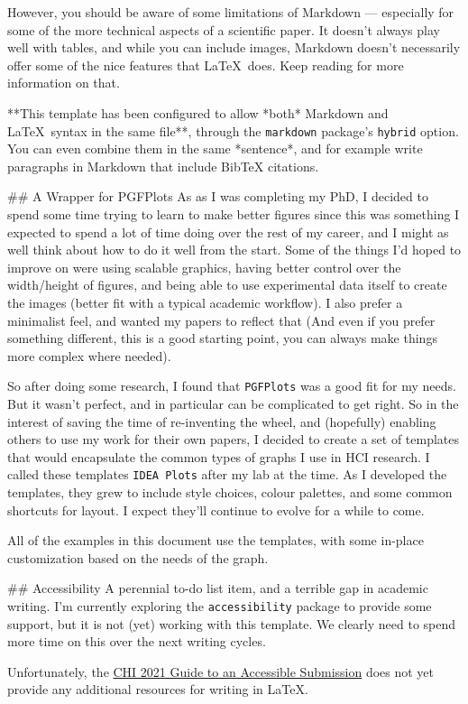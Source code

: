 \begin{markdown}
However, you should be aware of some limitations of Markdown --- especially for some of the more technical aspects of a scientific paper. It doesn't always play well with tables, and while you can include images, Markdown doesn't necessarily offer some of the nice features that \LaTeX\ does. Keep reading for more information on that. 

**This template has been configured to allow *both* Markdown and \LaTeX\ syntax in the same file**, through the \texttt{markdown} package's \texttt{hybrid} option. You can even combine them in the same *sentence*, and for example write paragraphs in Markdown that include BibTeX citations.



## A Wrapper for PGFPlots
As as I was completing my PhD, I decided to spend some time trying to learn to make better figures since this was something I expected to spend a lot of time doing over the rest of my career, and I might as well think about how to do it well from the start. Some of the things I'd hoped to improve on were using scalable graphics, having better control over the width/height of figures, and being able to use experimental data itself to create the images (better fit with a typical academic workflow). I also prefer a minimalist feel, and wanted my papers to reflect that (And even if you prefer something different, this is a good starting point, you can always make things more complex where needed). 

So after doing some research, I found that \texttt{PGFPlots} was a good fit for my needs. But it wasn't perfect, and in particular can be complicated to get right. So in the interest of saving the time of re-inventing the wheel, and (hopefully) enabling others to use my work for their own papers, I decided to create a set of templates that would encapsulate the common types of graphs I use in HCI research. I called these templates \texttt{IDEA Plots} after my lab at the time. As I developed the templates, they grew to include style choices, colour palettes, and some common shortcuts for layout. I expect they'll continue to evolve for a while to come.  

All of the examples in this document use the templates, with some in-place customization based on the needs of the graph. 



## Accessibility
A perennial to-do list item, and a terrible gap in academic writing. I'm currently exploring the \texttt{accessibility} package to provide some support, but it is not (yet) working with this template. We clearly need to spend more time on this over the next writing cycles.

Unfortunately, the \href{https://chi2021.acm.org/for-authors/presenting/papers/guide-to-an-accessible-submission}{CHI 2021 Guide to an Accessible Submission} does not yet provide any additional resources for writing in \LaTeX. 


\end{markdown}